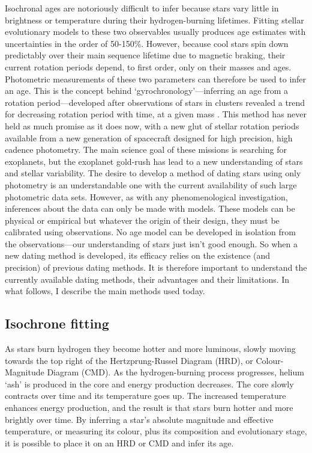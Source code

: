 Isochronal ages are notoriously difficult to infer because stars vary little
in brightness or temperature during their hydrogen-burning lifetimes.
Fitting stellar evolutionary models to these two observables usually produces
age estimates with uncertainties in the order of 50-150\%.
However, because cool stars spin down predictably over their main sequence
lifetime due to magnetic braking, their current rotation periods depend, to
first order, only on their masses and ages.
Photometric measurements of these two parameters can therefore be used to
infer an age.
This is the concept behind `gyrochronology'---inferring an age from a rotation
period---developed after observations of stars in clusters revealed a trend
for decreasing rotation period with time, at a given mass \citep{Weber1967,
Skumanich1972, Barnes2003, Irwin2009}.
This method has never held as much promise as it does now, with a new glut of
stellar rotation periods available from a new generation of spacecraft
designed for high precision, high cadence photometry.
The main science goal of these missions is searching for exoplanets, but the
exoplanet gold-rush has lead to a new understanding of stars and stellar
variability.
The desire to develop a method of dating stars using only photometry is an
understandable one with the current availability of such large photometric
data sets.
However, as with any phenomenological investigation, inferences about the data
can only be made with models.
These models can be physical or empirical but whatever the origin of their
design, they must be calibrated using observations.
No age model can be developed in isolation from the observations---our
understanding of stars just isn't good enough.
So when a new dating method is developed, its efficacy relies on the existence
(and precision) of previous dating methods.
It is therefore important to understand the currently available dating
methods, their advantages and their limitations.
In what follows, I describe the main methods used today.

\subsection{Isochrone fitting}

As stars burn hydrogen they become hotter and more luminous, slowly moving
towards the top right of the Hertzprung-Russel Diagram (HRD), or
Colour-Magnitude Diagram (CMD).
As the hydrogen-burning process progresses, helium `ash' is produced in the
core and energy production decreases.
The core slowly contracts over time and its temperature goes up.
The increased temperature enhances energy production, and the result is that
stars burn hotter and more brightly over time.
By inferring a star's absolute magnitude and effective temperature, or
measuring its colour, plus its composition and evolutionary stage, it is
possible to place it on an HRD or CMD and infer its age.

